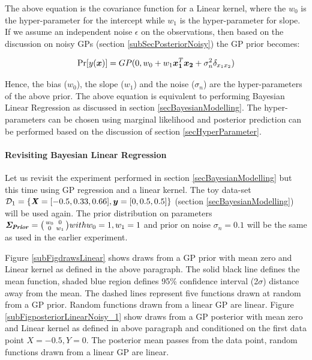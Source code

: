 The above equation is the covariance function for a Linear kernel, where the $w_{0}$ is the hyper-parameter for the intercept while $w_{1}$ is the hyper-parameter for slope. If we assume an independent noise $\epsilon$ on the observations, then based on the discussion on noisy GPs (section \ref{subSecPosteriorNoisy}) the GP prior becomes:

\begin{equation}\label{eqNoisyPriorDistributionOverLinearFunctions}
    \Pr[y(\boldsymbol{x})] = GP(0, w_{0} + w_{1} \boldsymbol{x_{1}}^T \boldsymbol{x_{2}} + \sigma_{n}^2\delta_{x_{1} x_{2}})
\end{equation}

Hence, the bias ($w_{0}$), the slope ($w_{1}$) and the noise ($\sigma_{n}$) are the hyper-parameters of the above prior. The above equation is equivalent to performing Bayesian Linear Regression as discussed in section \ref{secBayesianModelling}. The hyper-parameters can be chosen using marginal likelihood and posterior prediction can be performed based on the discussion of section \ref{secHyperParameter}. 

\begin{mdframed}[hidealllines=true,backgroundcolor=lightgray!20]
\paragraph{Revisiting Bayesian Linear Regression}\label{paraLinearGPExperiment}
Let us revisit the experiment performed in section \ref{secBayesianModelling} but this time using GP regression and a linear kernel. The toy data-set $\mathcal{D}_{1} = \{\bm{\mathit{X}} = [-0.5, 0.33, 0.66], \boldsymbol{y} = [0, 0.5, 0.5]\}$ (section \ref{secBayesianModelling}) will be used again. The prior distribution on parameters $\bm{\mathit{\Sigma_{Prior}}} =  \bigl( \begin{smallmatrix} w_{0} & 0\\ 0 & w_{1}\end{smallmatrix}\bigr)  with w_{0} = 1, w_{1} = 1$ and prior on noise $\sigma_{n} = 0.1$ will be the same as used in the earlier experiment. 

Figure \ref{subFigdrawsLinear} shows draws from a GP prior with mean zero and Linear kernel as defined in the above paragraph. The solid black line defines the mean function, shaded blue region defines 95\% confidence interval (2$\sigma$) distance away from the mean. The dashed lines represent five functions drawn at random from a GP prior. Random functions drawn from a linear GP are linear. Figure \ref{subFigposteriorLinearNoisy_1} show draws from a GP posterior with mean zero and Linear kernel  as defined in above paragraph and conditioned on the first data point $X = -0.5, Y = 0$. The posterior mean passes from the data point, random functions drawn from a linear GP are linear.
\end{mdframed}

